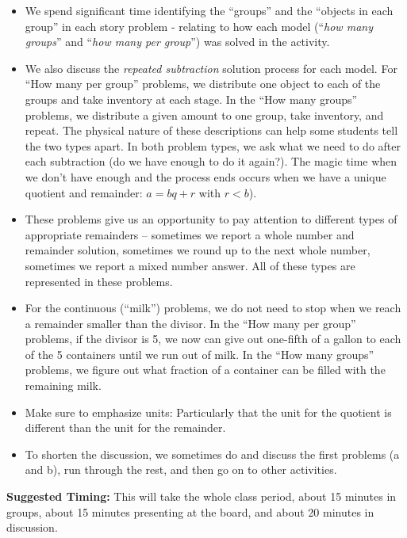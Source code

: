 \documentclass[nooutcomes,noauthor,handout]{ximera}
\begin{document}
\begin{instructorNotes}
\begin{itemize}
	\item We spend significant time identifying the ``groups'' and the ``objects in each group'' in each story problem - relating to how each model (``{\em how many groups}'' and ``{\em how many per group}'') was solved in the activity.
	\item We also discuss the {\em repeated subtraction} solution process for each model.  For ``How many per group'' problems, we distribute one object to each of the groups and take inventory at each stage.  In the ``How many groups'' problems, we distribute a given amount to one group, take inventory, and repeat.  The physical nature of these descriptions can help some students tell the two types apart.  In both problem types, we ask what we need to do after each subtraction (do we have enough to do it again?). The magic time when we don't have enough and the process ends occurs when we have a unique quotient and remainder:  $a = bq + r$ with $r < b$).  
	\item These problems give us an opportunity to pay attention to different types of appropriate remainders -- sometimes we report a whole number and remainder solution, sometimes we round up to the next whole number, sometimes we report a mixed number answer.  All of these types are represented in these problems. 
	\item For the continuous (``milk'') problems, we do not need to stop when we reach a remainder smaller than the divisor.  In the ``How many per group'' problems, if the divisor is 5, we now can give out one-fifth of a gallon to each of the 5 containers until we run out of milk.  In the ``How many groups'' problems, we figure out what fraction of a container can be filled with the remaining milk.
	\item Make sure to emphasize units:  Particularly that the unit for the quotient is different than the unit for the remainder.
    \item To shorten the discussion, we sometimes do and discuss the first problems (a and b), run through the rest, and then go on to other activities.
\end{itemize}



{\bf Suggested Timing:} This will take the whole class period, about 15 minutes in groups, about 15 minutes presenting at the board, and about 20 minutes in discussion.
\end{instructorNotes}
\end{document}

